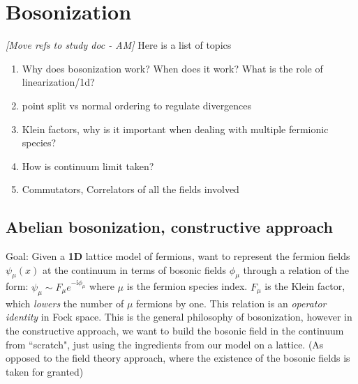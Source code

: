\documentclass{article}
\newcommand\AM[1]{{\it \color{darkblue}  [#1 - AM]}}
\renewcommand{\i}{\mathrm{i}}
\renewcommand{\i}{\mathrm{i}}
\begin{document}
\section{Bosonization}
\AM{Move refs to study doc}
Here is a list of topics
\begin{enumerate}
    \item Why does bosonization work? When does it work? What is the role of linearization/1d?
    \item point split vs normal ordering to regulate divergences
    \item Klein factors, why is it important when dealing with multiple fermionic species?
    \item How is continuum limit taken?
    \item Commutators, Correlators of all the fields involved
\end{enumerate}

\subsection{Abelian bosonization, constructive approach}
Goal: Given a \textbf{1D} lattice model of fermions, want to represent the fermion fields $\psi_{\mu}(x)$ at the continuum in terms of bosonic fields $\phi_\mu$ through a relation of the form: $\psi_{\mu} \sim F_{\mu} e^{-\i \phi_{\mu}}$ where $\mu$ is the fermion species index. $F_{\mu}$ is the Klein factor, which \emph{lowers} the number of $\mu$ fermions by one. This relation is an \emph{operator identity} in Fock space.
This is the general philosophy of bosonization, however in the constructive approach, we want to build the bosonic field in the continuum from ``scratch", just using the ingredients from our model on a lattice. (As opposed to the field theory approach, where the existence of the bosonic fields is taken for granted)
\end{document}
